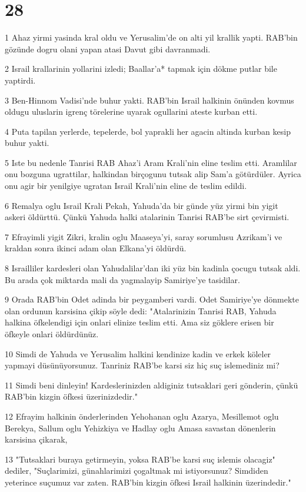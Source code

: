 \chapter{28}

\par 1 Ahaz yirmi yasinda kral oldu ve Yerusalim'de on alti yil krallik yapti. RAB'bin gözünde dogru olani yapan atasi Davut gibi davranmadi.
\par 2 Israil krallarinin yollarini izledi; Baallar'a* tapmak için dökme putlar bile yaptirdi.
\par 3 Ben-Hinnom Vadisi'nde buhur yakti. RAB'bin Israil halkinin önünden kovmus oldugu uluslarin igrenç törelerine uyarak ogullarini ateste kurban etti.
\par 4 Puta tapilan yerlerde, tepelerde, bol yaprakli her agacin altinda kurban kesip buhur yakti.
\par 5 Iste bu nedenle Tanrisi RAB Ahaz'i Aram Krali'nin eline teslim etti. Aramlilar onu bozguna ugrattilar, halkindan birçogunu tutsak alip Sam'a götürdüler. Ayrica onu agir bir yenilgiye ugratan Israil Krali'nin eline de teslim edildi.
\par 6 Remalya oglu Israil Krali Pekah, Yahuda'da bir günde yüz yirmi bin yigit askeri öldürttü. Çünkü Yahuda halki atalarinin Tanrisi RAB'be sirt çevirmisti.
\par 7 Efrayimli yigit Zikri, kralin oglu Maaseya'yi, saray sorumlusu Azrikam'i ve kraldan sonra ikinci adam olan Elkana'yi öldürdü.
\par 8 Israilliler kardesleri olan Yahudalilar'dan iki yüz bin kadinla çocugu tutsak aldi. Bu arada çok miktarda mali da yagmalayip Samiriye'ye tasidilar.
\par 9 Orada RAB'bin Odet adinda bir peygamberi vardi. Odet Samiriye'ye dönmekte olan ordunun karsisina çikip söyle dedi: "Atalarinizin Tanrisi RAB, Yahuda halkina öfkelendigi için onlari elinize teslim etti. Ama siz göklere erisen bir öfkeyle onlari öldürdünüz.
\par 10 Simdi de Yahuda ve Yerusalim halkini kendinize kadin ve erkek köleler yapmayi düsünüyorsunuz. Tanriniz RAB'be karsi siz hiç suç islemediniz mi?
\par 11 Simdi beni dinleyin! Kardeslerinizden aldiginiz tutsaklari geri gönderin, çünkü RAB'bin kizgin öfkesi üzerinizdedir."
\par 12 Efrayim halkinin önderlerinden Yehohanan oglu Azarya, Mesillemot oglu Berekya, Sallum oglu Yehizkiya ve Hadlay oglu Amasa savastan dönenlerin karsisina çikarak,
\par 13 "Tutsaklari buraya getirmeyin, yoksa RAB'be karsi suç islemis olacagiz" dediler, "Suçlarimizi, günahlarimizi çogaltmak mi istiyorsunuz? Simdiden yeterince suçumuz var zaten. RAB'bin kizgin öfkesi Israil halkinin üzerindedir."
